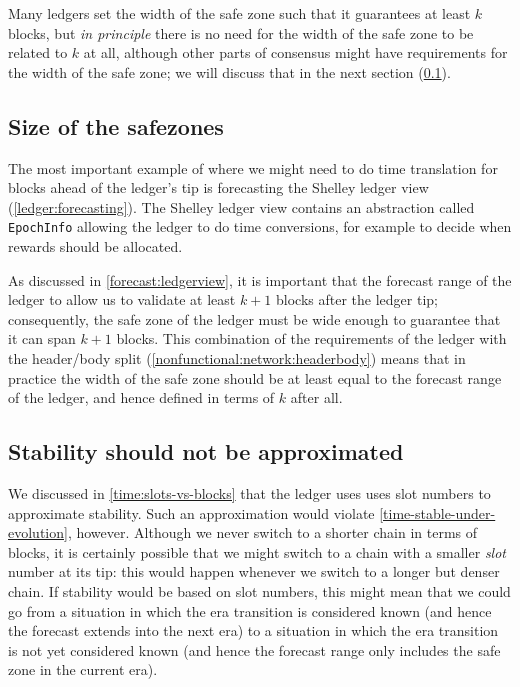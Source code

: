 Many ledgers set the width of the safe zone such that it guarantees at least $k$
blocks, but \emph{in principle} there is no need for the width of the safe zone
to be related to $k$ at all, although other parts of consensus might have
requirements for the width of the safe zone; we will discuss that in the next
section (\cref{time:ledgerrestrictions:safezones}).

\subsection{Size of the safezones}
\label{time:ledgerrestrictions:safezones}

The most important example of where we might need to do time translation for
blocks ahead of the ledger's tip is forecasting the Shelley ledger view
(\cref{ledger:forecasting}). The Shelley ledger view contains an abstraction
called \lstinline!EpochInfo! allowing the ledger to do time conversions, for
example to decide when rewards should be allocated.

As discussed in \cref{forecast:ledgerview}, it is important that the forecast
range of the ledger to allow us to validate at least $k + 1$ blocks after the
ledger tip; consequently, the safe zone of the ledger must be wide enough to
guarantee that it can span $k + 1$ blocks. This combination of the requirements
of the ledger with the header/body split
(\cref{nonfunctional:network:headerbody}) means that in practice the width of
the safe zone should be at least equal to the forecast range of the ledger, and
hence defined in terms of $k$ after all.

\subsection{Stability should not be approximated}

We discussed in \cref{time:slots-vs-blocks} that the ledger uses uses slot
numbers to approximate stability. Such an approximation would violate
\cref{time-stable-under-evolution}, however. Although we never switch to a
shorter chain in terms of blocks, it is certainly possible that we might switch
to a chain with a smaller \emph{slot} number at its tip: this would happen
whenever we switch to a longer but denser chain. If stability would be based on
slot numbers, this might mean that we could go from a situation in which the era
transition is considered known (and hence the forecast extends into the next
era) to a situation in which the era transition is not yet considered known (and
hence the forecast range only includes the safe zone in the current era).

